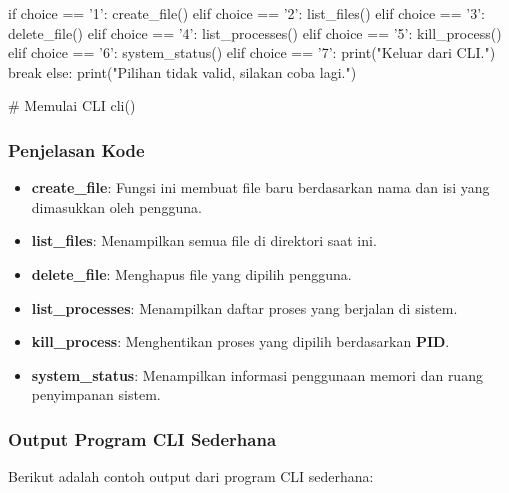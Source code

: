 \documentclass[12pt]{article}
\begin{document}
\begin{python}
            if choice == '1':
                create_file()
            elif choice == '2':
                list_files()
            elif choice == '3':
                delete_file()
            elif choice == '4':
                list_processes()
            elif choice == '5':
                kill_process()
            elif choice == '6':
                system_status()
            elif choice == '7':
                print("Keluar dari CLI.")
                break
            else:
                print("Pilihan tidak valid, silakan coba lagi.")
    
    # Memulai CLI
    cli()
\end{python}


\subsubsection{\textbf{Penjelasan Kode}}

\begin{itemize}
    \item \textbf{create\_file}: Fungsi ini membuat file baru berdasarkan nama dan isi yang dimasukkan oleh pengguna.
    \item \textbf{list\_files}: Menampilkan semua file di direktori saat ini.
    \item \textbf{delete\_file}: Menghapus file yang dipilih pengguna.
    \item \textbf{list\_processes}: Menampilkan daftar proses yang berjalan di sistem.
    \item \textbf{kill\_process}: Menghentikan proses yang dipilih berdasarkan \textbf{PID}.
    \item \textbf{system\_status}: Menampilkan informasi penggunaan memori dan ruang penyimpanan sistem.
\end{itemize}

 
\subsubsection{\textbf{Output Program CLI Sederhana}}

Berikut adalah contoh output dari program CLI sederhana:
\end{document}
